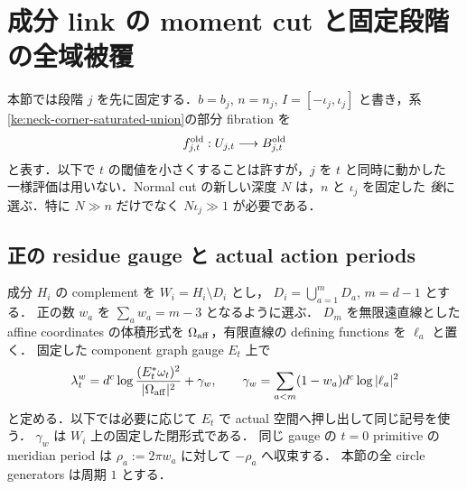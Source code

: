 \section{成分 link の moment cut と固定段階の全域被覆}
\label{ke:component-link-cover-section}

本節では段階 $j$ を先に固定する．$b=b_j$, $n=n_j$, $I=[-\iota_j,\iota_j]$
と書き，系\ref{ke:neck-corner-saturated-union}の部分 fibration を
\[
 f^{\rm old}_{j,t}:U_{j,t}\longrightarrow B^{\rm old}_{j,t}
\]
と表す．以下で $t$ の閾値を小さくすることは許すが，$j$ を $t$ と同時に動かした
一様評価は用いない．Normal cut の新しい深度 $N$ は，$n$ と $\iota_j$ を固定した
\emph{後}に選ぶ．特に $N\gg n$ だけでなく $N\iota_j\gg1$ が必要である．

\subsection{正の residue gauge と actual action periods}

成分 $H_i$ の complement を $W_i=H_i\setminus D_i$ とし，
$D_i=\bigcup_{a=1}^{m}D_a$, $m=d-1$ とする．
正の数 $w_a$ を $\sum_aw_a=m-3$ となるように選ぶ．
$D_m$ を無限遠直線とした affine coordinates の体積形式を
$\Omega_{\rm aff}$，有限直線の defining functions を $\ell_a$ と置く．
固定した component graph gauge $E_t$ 上で
\begin{equation}\label{ke:eq:component-positive-gauge}
 \lambda_t^w
 =d^c\log\frac{(E_t^*\omega_t)^2}{|\Omega_{\rm aff}|^2}
   +\gamma_w,
 \qquad
 \gamma_w=\sum_{a<m}(1-w_a)d^c\log|\ell_a|^2
\end{equation}
と定める．以下では必要に応じて $E_t$ で actual 空間へ押し出して同じ記号を使う．
$\gamma_w$ は $W_i$ 上の固定した閉形式である．
同じ gauge の $t=0$ primitive の meridian period は
$\rho_a:=2\pi w_a$ に対して $-\rho_a$ へ収束する．
本節の全 circle generators は周期 $1$ とする．

